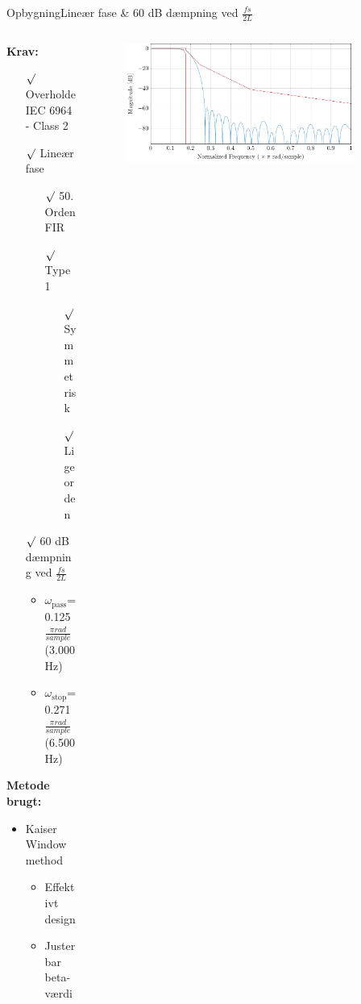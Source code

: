 \begin{frame}{Opbygning}{Lineær fase \& 60 dB dæmpning ved $\frac{fs}{2L}$}

\begin{columns}
  \begin{column}{0.5\textwidth}
\textbf{Krav:}
\begin{itemize}
\item[$\surd$] Overholde IEC 6964 - Class 2
\item[$\surd$] Lineær fase
\begin{itemize}
\item[$\surd$] 50. Orden FIR
\item[$\surd$] Type 1
\begin{itemize}
\item[$\surd$] Symmetrisk
\item[$\surd$] Lige orden
\end{itemize}
\end{itemize}
\item[$\surd$] 60 dB dæmpning ved $\frac{fs}{2L}$
\begin{itemize}
\item $\omega_{\text{pass}}$= 0.125 $\frac{\pi rad}{sample} $ (3.000Hz)
\item $\omega_{\text{stop}}$= 0.271 $\frac{\pi rad}{sample} $ (6.500Hz)
\end{itemize}
\end{itemize}
\textbf{Metode brugt:}
\begin{itemize}
\item Kaiser Window method
\begin{itemize}
\item Effektivt design
\item Justerbar beta-værdi
\end{itemize}
\end{itemize}
  \end{column}
  \hspace*{-15mm}  
  \begin{column}{0.6\textwidth}

\begin{figure}
\centering
\includegraphics[width=0.9\textwidth]{Band1Filt}
\end{figure}
  \end{column}
\end{columns}
\end{frame}

